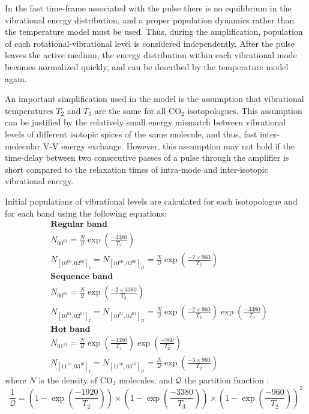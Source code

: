 \documentclass{report}
\begin{document}
In the fast time-frame associated with the pulse there is no equilibrium in the vibrational energy distribution, and a proper population dynamics rather than the temperature model must be used. Thus, during the amplification, population of each rotational-vibrational level is considered independently. After the pulse leaves the active medium, the energy distribution within each vibrational mode becomes normalized quickly, and can be described by the temperature model again.

An important simplification used in the model is the assumption that vibrational temperatures $T_2$ and $T_3$ are the same for all {CO$_2$} isotopologues. This assumption can be justified by the relatively small energy mismatch between vibrational levels of different isotopic spices of the same molecule, and thus, fast inter-molecular V-V energy exchange. However, this assumption may not hold if the time-delay between two consecutive passes of a pulse through the amplifier is short compared to the relaxation times of intra-mode and inter-isotopic vibrational energy.

Initial populations of vibrational levels are calculated for each isotopologue and for each band using the following equations:
\begin{equation}\label{eq:Boltzman}
\begin{aligned}
&\textbf{Regular band}\\
&N_{00^01}     =  \frac{N}{\mathcal{Q}}  \exp\left(\frac{-3380}{T_3}\right)\\
&N_{[10^00,02^00]_I}  = N_{[10^00,02^00]_{II}}  =  \frac{N}{\mathcal{Q}} \exp\left(\frac{-2\times 960}{T_2}\right)\\
&\textbf{Sequence band}\\
&N_{00^02}     =  \frac{N}{\mathcal{Q}}  \exp\left(\frac{-2\times 3380}{T_3}\right)\\
&N_{[10^01,02^01]_I}  =  N_{[10^01,02^01]_{II}} =  \frac{N}{\mathcal{Q}} \exp\left(\frac{-2\times 960}{T_2}\right) \exp\left(\frac{-3380}{T_3}\right)\\
&\textbf{Hot band}\\
&N_{01^11}     =  \frac{N}{\mathcal{Q}} \exp\left(\frac{-3380}{T_3}\right) \exp\left(\frac{-960}{T_2}\right)\\
&N_{[11^10,03^10]_I}  = N_{[11^10,03^10]_{II}} =   \frac{N}{\mathcal{Q}} \exp\left(\frac{-3\times 960}{T_2}\right)
\end{aligned}
\end{equation}
where $N$ is the density of {CO$_2$} molecules, and $\mathcal{Q}$ the partition function \cite{Witteman-1987}:
\begin{equation}
\frac{1}{\mathcal{Q}} = \left(1-\exp\left(\frac{-1920}{T_2}\right)\right) \times \left(1-\exp\left(\frac{-3380}{T_3}\right)\right) \times \left(1-\exp\left(\frac{-960}{T_2}\right)\right)^2
\end{equation}
\end{document}

